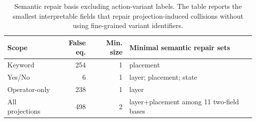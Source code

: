 \begin{table}[H]
\centering
\caption{Semantic repair basis excluding action-variant labels. The table reports the smallest interpretable fields that repair projection-induced collisions without using fine-grained variant identifiers.}
\label{tab:semantic-repair-basis}
\small
\begin{tabular}{lrrp{}}
\toprule
Scope & False eq. & Min. size & Minimal semantic repair sets \\
\midrule
Keyword & 254 & 1 & placement \\
Yes/No & 6 & 1 & layer; placement; state \\
Operator-only & 238 & 1 & layer \\
All projections & 498 & 2 & layer+placement among 11 two-field bases \\
\bottomrule
\end{tabular}
\end{table}

